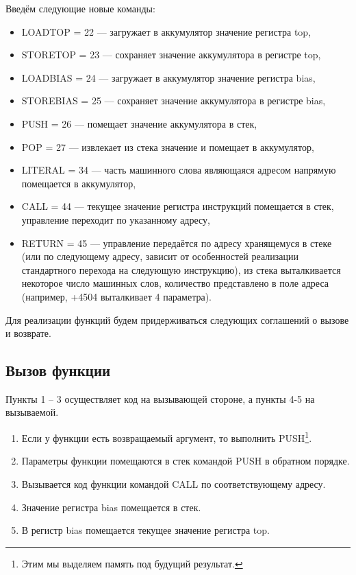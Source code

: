\documentclass[12pt]{article}
\begin{document}
Введём следующие новые команды:
\begin{itemize}
 \item LOADTOP = 22 --- загружает в аккумулятор значение регистра top,
 \item STORETOP = 23 --- сохраняет значение аккумулятора в регистре top,
 \item LOADBIAS = 24 --- загружает в аккумулятор значение регистра bias,
 \item STOREBIAS = 25 --- сохраняет значение аккумулятора в регистре bias,
 \item PUSH = 26 --- помещает значение аккумулятора в стек,
 \item POP = 27 --- извлекает из стека значение и помещает в аккумулятор,

 \item LITERAL = 34 --- часть машинного слова являющаяся адресом напрямую помещается в аккумулятор,

 \item CALL = 44 --- текущее значение регистра инструкций помещается в стек, управление переходит по указанному адресу,
 \item RETURN = 45 --- управление передаётся по адресу хранящемуся в стеке (или по следующему адресу, зависит от
 особенностей реализации стандартного перехода на следующую инструкцию), из стека выталкивается некоторое число
машинных слов, количество представлено в поле адреса (например, +4504 выталкивает 4 параметра).
\end{itemize}

Для реализации функций будем придерживаться следующих соглашений о вызове и возврате.
\subsection{Вызов функции}
Пункты 1 -- 3 осуществляет код на вызывающей стороне, а пункты 4-5 на вызываемой.
\begin{enumerate}
 \item Если у функции есть возвращаемый аргумент, то выполнить PUSH\footnote{Этим мы выделяем память под будущий
 результат.}.
 \item Параметры функции помещаются в стек командой PUSH в обратном порядке.
 \item Вызывается код функции командой CALL  по соответствующему адресу.
 \item Значение регистра bias помещается в стек. 
 \item В регистр bias помещается текущее значение регистра top.
\end{enumerate}
\end{document}
